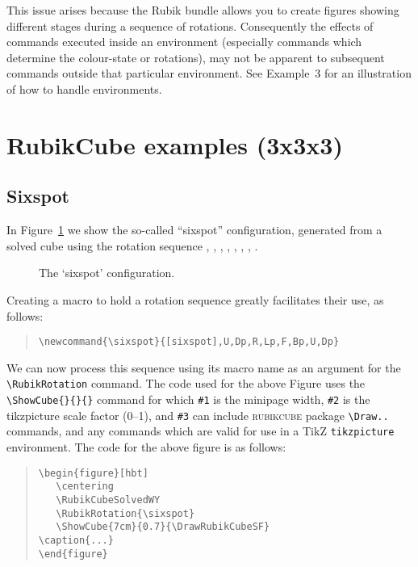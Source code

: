\documentclass[a4paper]{article}
\begin{document}
This issue arises because the Rubik bundle allows you to create figures 
showing different stages  during a sequence of rotations. Consequently 
the effects of  commands executed inside an environment (especially 
commands which determine the colour-state or rotations), may not  be 
apparent to subsequent commands outside that particular environment. 
See Example~3  for an illustration of how to handle environments.

\pagebreak

\section{RubikCube examples (3x3x3)}

\subsection{Sixspot}

In Figure~\ref{fig:sixspot} we show  the so-called ``sixspot'' configuration,
 generated from a solved cube using the rotation sequence 
, , , , , , , .

\begin{figure}[hbt]
\centering
\RubikCubeSolvedWY
\RubikRotation{\sixspot}
\caption{\label{fig:sixspot}The `sixspot' configuration.}
\end{figure}

{\noindent}Creating a macro to hold  a rotation sequence greatly 
facilitates their use, as follows:
\begin{quote}
\begin{verbatim}
\newcommand{\sixspot}{[sixspot],U,Dp,R,Lp,F,Bp,U,Dp}
\end{verbatim}
\end{quote}
We can now process this sequence  using its macro name as an argument 
for the \verb!\RubikRotation! command. The code used for the above 
Figure  uses the \verb!\ShowCube{}{}{}! command for which \verb!#1! 
is the minipage width, \verb!#2! is the tikzpicture scale factor (0--1), 
and \verb!#3!  can include  \textsc{rubikcube} package  \verb!\Draw..! 
commands,  and any commands which are valid for use in a TikZ 
\texttt{tikzpicture} environment. The code for the above figure is 
as follows:

\begin{quote}
\begin{verbatim}
\begin{figure}[hbt]
   \centering
   \RubikCubeSolvedWY
   \RubikRotation{\sixspot}
   \ShowCube{7cm}{0.7}{\DrawRubikCubeSF}
\caption{...}
\end{figure}
\end{verbatim}
\end{quote}
\end{document}
